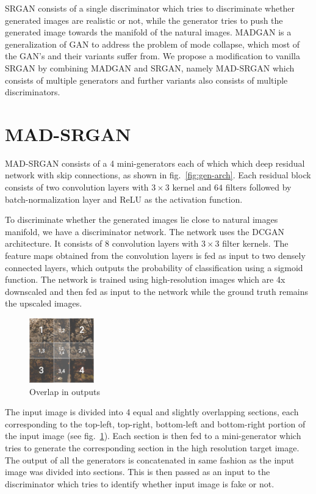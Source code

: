 \documentclass[12pt,a4paper,twocolumn]{article}
\begin{document}
        SRGAN consists of a single discriminator which tries to discriminate whether generated images are realistic or not, while the generator tries to push the generated image towards the manifold of the natural images.
        MADGAN \cite{madgan} is a generalization of GAN to address the problem of mode collapse, which most of the GAN's and their variants suffer from.
        We propose a modification to vanilla SRGAN by combining MADGAN and SRGAN, namely MAD-SRGAN which consists of multiple generators and further variants also consists of multiple discriminators.

    \section{MAD-SRGAN}
        MAD-SRGAN consists of a 4 mini-generators each of which which deep residual network \cite{resnet} with skip connections, as shown in fig.~\ref{fig:gen-arch}.
        Each residual block consists of two convolution layers with $3\times3$ kernel and $64$ filters followed by batch-normalization \cite{batch-norm} layer and ReLU as the activation function.

        To discriminate whether the generated images lie close to natural images manifold, we have a discriminator network.
        The network uses the DCGAN \cite{dcgan} architecture.
        It consists of 8 convolution layers with $3\times3$ filter kernels.
        The feature maps obtained from the convolution layers is fed as input to two densely connected layers, which outputs the probability of classification using a sigmoid function.
        The network is trained using high-resolution images which are 4x downscaled and then fed as input to the network while the ground truth remains the upscaled images.

        \begin{figure}
            \centering
            \includegraphics[width=0.25\textwidth]{images/overlap.png}
            \caption{Overlap in outputs}
            \label{fig:overlap}
        \end{figure}

        The input image is divided into 4 equal and slightly overlapping sections, each corresponding to the top-left, top-right, bottom-left and bottom-right portion of the input image (see fig.~\ref{fig:overlap}).
        Each section is then fed to a mini-generator which tries to generate the corresponding section in the high resolution target image.
        The output of all the generators is concatenated in same fashion as the input image was divided into sections.
        This is then passed as an input to the discriminator which tries to identify whether input image is fake or not.
\end{document}
